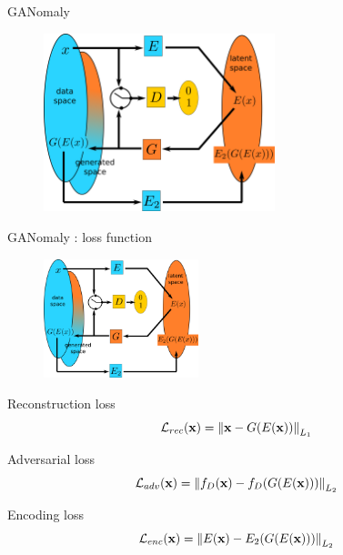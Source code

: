 \documentclass[xcolor=pdftex,dvipsnames,table,mathserif]{beamer}
\begin{document}
\begin{frame}{GANomaly \cite{akcay_ganomaly:_2019}}

  \begin{figure}[ht]
    \centering
    \includegraphics[width=0.6\textwidth]{ganomaly}
  \end{figure}



\end{frame}

\begin{frame}{GANomaly : loss function}

  \begin{figure}[ht]
    \centering
    \includegraphics[width=0.4\textwidth]{ganomaly}
  \end{figure}

\small

  \begin{block}{Reconstruction loss}
    \[ \mathcal{L}_{rec}(\mathbf{x}) = \norm{\mathbf{x} - G(E(\mathbf{x}))}_{L_1} \]
  \end{block}

  \begin{block}{Adversarial loss}
    \[ \mathcal{L}_{adv}(\mathbf{x}) = \norm{f_D(\mathbf{x}) - f_D(G(E(\mathbf{x})))}_{L_2} \]
  \end{block}

  \begin{block}{Encoding loss}
    \[ \mathcal{L}_{enc}(\mathbf{x}) = \norm{E(\mathbf{x}) - E_2(G(E(\mathbf{x})))}_{L_2} \]
  \end{block}

\end{frame}
\end{document}
